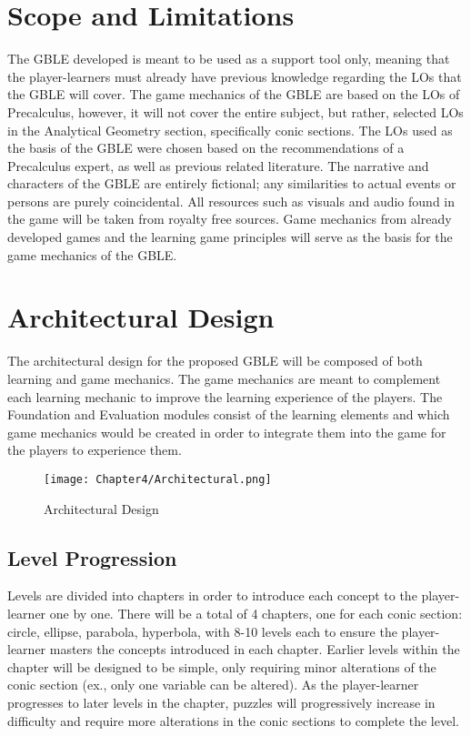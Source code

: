 \section{Scope and Limitations}
\label{sec:gamescopelimitation}
The GBLE developed is meant to be used as a support tool only, meaning that the player-learners must already have previous knowledge regarding the LOs that the GBLE will cover. The game mechanics of the GBLE are based on the LOs of Precalculus, however, it will not cover the entire subject, but rather, selected LOs in the Analytical Geometry section, specifically conic sections. The LOs used as the basis of the GBLE were chosen based on the recommendations of a Precalculus expert, as well as previous related literature.
The narrative and characters of the GBLE are entirely fictional; any similarities to actual events or persons are purely coincidental. All resources such as visuals and audio found in the game will be taken from royalty free sources. Game mechanics from already developed games and the learning game principles will serve as the basis for the game mechanics of the GBLE.

\section{Architectural Design}
\label{sec:gamearchdesign}
The architectural design for the proposed GBLE will be composed of both learning and game mechanics. The game mechanics are meant to complement each learning mechanic to improve the learning experience of the players. The Foundation and Evaluation modules consist of the learning elements and which game mechanics would be created in order to integrate them into the game for the players to experience them.

\begin{figure}[H]
\hspace*{-1cm}
   \centering                  
   \texttt{[image: Chapter4/Architectural.png]}      
   \caption{Architectural Design}
    \label{fig:Architectural}
\end{figure}

\subsection{Level Progression}
\label{sec:lvlprog}
Levels are divided into chapters in order to introduce each concept to the player-learner one by one. There will be a total of 4 chapters, one for each conic section: circle, ellipse, parabola, hyperbola, with 8-10 levels each to ensure the player-learner masters the concepts introduced in each chapter. Earlier levels within the chapter will be designed to be simple, only requiring minor alterations of the conic section (ex., only one variable can be altered). As the player-learner progresses to later levels in the chapter, puzzles will progressively increase in difficulty and require more alterations in the conic sections to complete the level.

